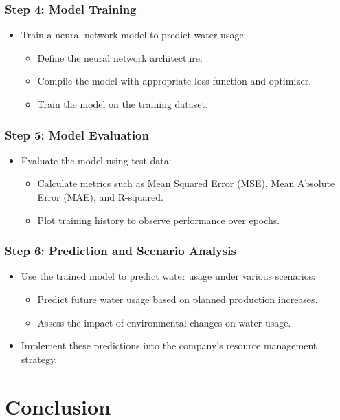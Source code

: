 \documentclass{beamer}
\begin{document}
\begin{frame}
\frametitle{Step 4: Model Training}
\begin{itemize}
    \item Train a neural network model to predict water usage:
        \begin{itemize}
            \item Define the neural network architecture.
            \item Compile the model with appropriate loss function and optimizer.
            \item Train the model on the training dataset.
        \end{itemize}
\end{itemize}
\end{frame}

\begin{frame}
\frametitle{Step 5: Model Evaluation}
\begin{itemize}
    \item Evaluate the model using test data:
        \begin{itemize}
            \item Calculate metrics such as Mean Squared Error (MSE), Mean Absolute Error (MAE), and R-squared.
            \item Plot training history to observe performance over epochs.
        \end{itemize}
\end{itemize}
\end{frame}

\begin{frame}
\frametitle{Step 6: Prediction and Scenario Analysis}
\begin{itemize}
    \item Use the trained model to predict water usage under various scenarios:
        \begin{itemize}
            \item Predict future water usage based on planned production increases.
            \item Assess the impact of environmental changes on water usage.
        \end{itemize}
    \item Implement these predictions into the company's resource management strategy.
\end{itemize}
\end{frame}

\section{Conclusion}
\end{document}
